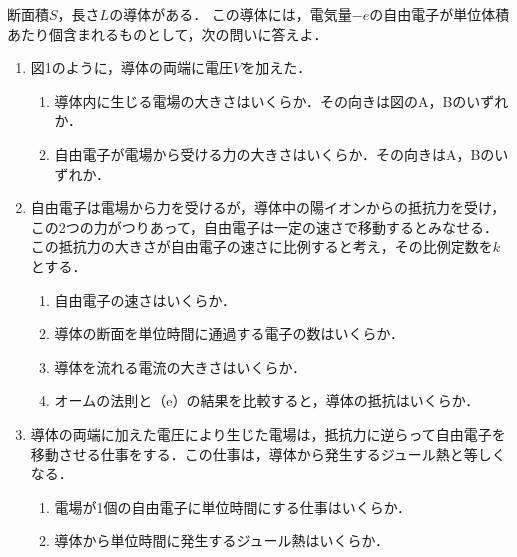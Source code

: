\setcounter{figure}{0}
断面積$S$，長さ$L$の導体がある．
この導体には，電気量$-e$の自由電子が単位体積あたり\nn 個含まれるものとして，次の問いに答えよ．

\begin{enumerate}[（1）]
  \setlength{\leftskip}{-1.5zw}
  \setlength{\itemindent}{1zw}\setlength{\labelsep}{0.5zw}
  \setlength{\labelwidth}{1zw}\setlength{\leftmargin}{1zw}
  \setlength{\itemsep}{0.5\baselineskip}
  \item 図1のように，導体の両端に電圧$V$を加えた．
  \begin{enumerate}[（a）]
    \setlength{\leftskip}{-2.5zw}
    \setlength{\itemindent}{1zw}\setlength{\labelsep}{1zw}
    \setlength{\labelwidth}{1zw}
    \item 導体内に生じる電場の大きさはいくらか．その向きは図のA，Bのいずれか．
    \item 自由電子が電場から受ける力の大きさはいくらか．その向きはA，Bのいずれか．
  \end{enumerate}
  \item 自由電子は電場から力を受けるが，導体中の陽イオンからの抵抗力を受け，この2つの力がつりあって，自由電子は一定の速さで移動するとみなせる．
  この抵抗力の大きさが自由電子の速さに比例すると考え，その比例定数を$k$とする．
  \begin{enumerate}[（a）]
    \setlength{\leftskip}{-2.5zw}
    \setlength{\itemindent}{1zw}\setlength{\labelsep}{1zw}
    \setlength{\labelwidth}{1zw}
    \addtocounter{enumii}{2}
    \item 自由電子の速さはいくらか．
    \item 導体の断面を単位時間に通過する電子の数はいくらか．
    \item 導体を流れる電流の大きさはいくらか．
    \item オームの法則と（e）の結果を比較すると，導体の抵抗はいくらか．
  \end{enumerate}
  \item 導体の両端に加えた電圧により生じた電場は，抵抗力に逆らって自由電子を移動させる仕事をする．この仕事は，導体から発生するジュール熱と等しくなる．
  \begin{enumerate}[（a）]
    \setlength{\leftskip}{-2.5zw}
    \setlength{\itemindent}{1zw}\setlength{\labelsep}{1zw}
    \setlength{\labelwidth}{1zw}
    \addtocounter{enumii}{6}
    \item 電場が1個の自由電子に単位時間にする仕事はいくらか．
    \item 導体から単位時間に発生するジュール熱はいくらか．
  \end{enumerate}
\end{enumerate}

